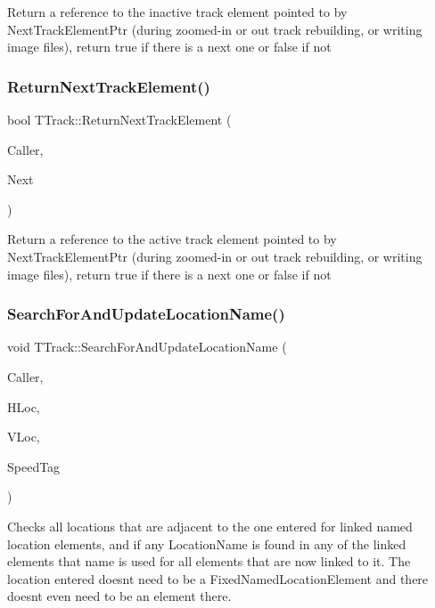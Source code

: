 Return a reference to the inactive track element pointed to by Next\+Track\+Element\+Ptr (during zoomed-\/in or out track rebuilding, or writing image files), return true if there is a next one or false if not \mbox{\label{class_t_track_a90e1db27659603b72a703c017ee576c8}} 
\subsubsection{\texorpdfstring{Return\+Next\+Track\+Element()}{ReturnNextTrackElement()}}
{\footnotesize\ttfamily bool T\+Track\+::\+Return\+Next\+Track\+Element (\begin{DoxyParamCaption}\item[{int}]{Caller,  }\item[{\mbox{\hyperlink{class_t_track_element}{T\+Track\+Element}} \&}]{Next }\end{DoxyParamCaption})}

Return a reference to the active track element pointed to by Next\+Track\+Element\+Ptr (during zoomed-\/in or out track rebuilding, or writing image files), return true if there is a next one or false if not \mbox{\label{class_t_track_a68519138e3b39b6ab9433cc9f7862c64}} 
\subsubsection{\texorpdfstring{Search\+For\+And\+Update\+Location\+Name()}{SearchForAndUpdateLocationName()}}
{\footnotesize\ttfamily void T\+Track\+::\+Search\+For\+And\+Update\+Location\+Name (\begin{DoxyParamCaption}\item[{int}]{Caller,  }\item[{int}]{H\+Loc,  }\item[{int}]{V\+Loc,  }\item[{int}]{Speed\+Tag }\end{DoxyParamCaption})}

Checks all locations that are adjacent to the one entered for linked named location elements, and if any Location\+Name is found in any of the linked elements that name is used for all elements that are now linked to it. The location entered doesn\textquotesingle{}t need to be a Fixed\+Named\+Location\+Element and there doesn\textquotesingle{}t even need to be an element there.


